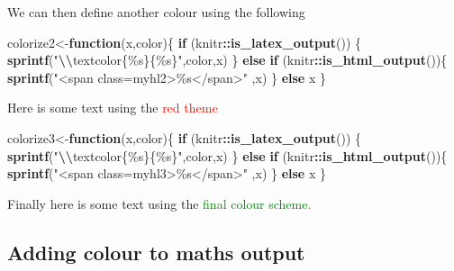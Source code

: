 \documentclass[
]{article}
\newenvironment{Shaded}{\begin{snugshade}}{\end{snugshade}}
\newcommand{\ControlFlowTok}[1]{\textcolor[rgb]{0.13,0.29,0.53}{\textbf{#1}}}
\newcommand{\FunctionTok}[1]{\textcolor[rgb]{0.13,0.29,0.53}{\textbf{#1}}}
\newcommand{\NormalTok}[1]{#1}
\newcommand{\OtherTok}[1]{\textcolor[rgb]{0.56,0.35,0.01}{#1}}
\newcommand{\SpecialCharTok}[1]{\textcolor[rgb]{0.81,0.36,0.00}{\textbf{#1}}}
\newcommand{\StringTok}[1]{\textcolor[rgb]{0.31,0.60,0.02}{#1}}
\numberwithin{equation}{section}
\numberwithin{figure}{section}
\theoremstyle{break}
\theoremstyle{definition}
\theoremstyle{definition}
\theoremstyle{definition}
\theoremstyle{definition}
\theoremstyle{remark}
\begin{document}
We can then define another colour using the following

\begin{Shaded}
\begin{Highlighting}[]
\NormalTok{colorize2}\OtherTok{\textless{}{-}}\ControlFlowTok{function}\NormalTok{(x,color)\{}
  \ControlFlowTok{if}\NormalTok{ (knitr}\SpecialCharTok{::}\FunctionTok{is\_latex\_output}\NormalTok{()) \{}
    \FunctionTok{sprintf}\NormalTok{(}\StringTok{"}\SpecialCharTok{\textbackslash{}\textbackslash{}}\StringTok{textcolor\{\%s\}\{\%s\}"}\NormalTok{,color,x)}
\NormalTok{  \} }\ControlFlowTok{else} \ControlFlowTok{if}\NormalTok{ (knitr}\SpecialCharTok{::}\FunctionTok{is\_html\_output}\NormalTok{())\{}
    \FunctionTok{sprintf}\NormalTok{(}\StringTok{"\textless{}span class=\textquotesingle{}myhl2\textquotesingle{}\textgreater{}\%s\textless{}/span\textgreater{}"}\NormalTok{ ,x)}
\NormalTok{  \} }\ControlFlowTok{else}\NormalTok{ x}
\NormalTok{\}}
\end{Highlighting}
\end{Shaded}

Here is some text using the \textcolor{red}{red theme}

\begin{Shaded}
\begin{Highlighting}[]
\NormalTok{colorize3}\OtherTok{\textless{}{-}}\ControlFlowTok{function}\NormalTok{(x,color)\{}
  \ControlFlowTok{if}\NormalTok{ (knitr}\SpecialCharTok{::}\FunctionTok{is\_latex\_output}\NormalTok{()) \{}
    \FunctionTok{sprintf}\NormalTok{(}\StringTok{"}\SpecialCharTok{\textbackslash{}\textbackslash{}}\StringTok{textcolor\{\%s\}\{\%s\}"}\NormalTok{,color,x)}
\NormalTok{  \} }\ControlFlowTok{else} \ControlFlowTok{if}\NormalTok{ (knitr}\SpecialCharTok{::}\FunctionTok{is\_html\_output}\NormalTok{())\{}
    \FunctionTok{sprintf}\NormalTok{(}\StringTok{"\textless{}span class=\textquotesingle{}myhl3\textquotesingle{}\textgreater{}\%s\textless{}/span\textgreater{}"}\NormalTok{ ,x)}
\NormalTok{  \} }\ControlFlowTok{else}\NormalTok{ x}
\NormalTok{\}}
\end{Highlighting}
\end{Shaded}

Finally here is some text using the \textcolor{green}{final colour scheme.}

\hypertarget{adding-colour-to-maths-output}{%
\subsection{Adding colour to maths output}\label{adding-colour-to-maths-output}}
\end{document}

